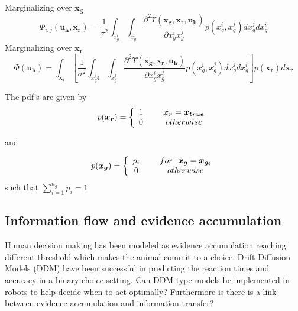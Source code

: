\documentclass[]{article}
\begin{document}
Marginalizing over $\boldsymbol{x_g}$
\begin{equation*}
\Phi_{i,j}(\boldsymbol{u_h}, \boldsymbol{x_r}) =
\frac{1}{\sigma^2}\int_{x_g^i}\int_{x_g^j}\frac{\partial^2\Upsilon(\boldsymbol{x_g}, \boldsymbol{x_r}, \boldsymbol{u_h})}{\partial x_g^ix_g^j}p(x_g^i, x_g^j)dx_g^jdx_g^i
\end{equation*}
Marginalizing over $\boldsymbol{x_r}$
\begin{equation*}
\Phi(\boldsymbol{u_h}) = \int_{\boldsymbol{x_r}}\left[\frac{1}{\sigma^2}\int_{x_g^i4}\int_{x_g^j}\frac{\partial^2\Upsilon(\boldsymbol{x_g}, \boldsymbol{x_r}, \boldsymbol{u_h})}{\partial x_g^ix_g^j}p(x_g^i, x_g^j)dx_g^jdx_g^i\right]p(\boldsymbol{x_r})d\boldsymbol{x_r}
\end{equation*}

The pdf's are given by
\begin{align*}
p(\boldsymbol{x_r}) = \left\{ 
\begin{array}{cc} 
1 & \hspace{5mm} \boldsymbol{x_r}=\boldsymbol{x_{true}} \\
0 & \hspace{5mm} otherwise
\end{array}\right. 
\end{align*}

and

\begin{align*}
p(\boldsymbol{x_g}) = \left\{ 
\begin{array}{cc} 
p_i & \hspace{5mm} for ~~ \boldsymbol{x_g} = \boldsymbol{x_{g_i}} \\
0 & \hspace{5mm} otherwise
\end{array}\right. 
\end{align*}
such that $\sum_{i=1}^{n_g} p_i = 1$

\subsection*{Information flow and evidence accumulation}

Human decision making has been modeled as evidence accumulation reaching different threshold which makes the animal commit to a choice. Drift Diffusion Models (DDM) have been successful in predicting the reaction times and accuracy in a binary choice setting. 
Can DDM type models be implemented in robots to help decide when to act optimally? Furthermore is there is a link between evidence accumulation and information transfer?
\end{document}
